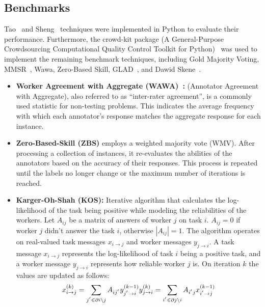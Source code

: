 \subsection{Benchmarks}
Tao~\cite{tao_Label_2020} and Sheng~\cite{sheng_Majority_2019} techniques were implemented in Python to evaluate their performance. Furthermore, the crowd-kit package (A General-Purpose Crowdsourcing Computational Quality Control Toolkit for Python)~\cite{ustalov_learning_2021 } was used to implement the remaining benchmark techniques, including Gold Majority Voting, MMSR~\cite{ma_Adversarial_2020}, Wawa, Zero-Based Skill, GLAD~\cite{whitehill_Whose_2009}, and Dawid Skene~\cite{dawid_Maximum_1979}.
%
\begin{itemize}
    \item \textbf{Worker Agreement with Aggregate (WAWA)~\cite{crowdkit_wawa_2023}:} (Annotator Agreement with Aggregate), also referred to as ``inter-rater agreement'', is a commonly used statistic for non-testing problems. This indicates the average frequency with which each annotator's response matches the aggregate response for each instance.
    \item \textbf{Zero-Based-Skill (ZBS)} employs a weighted majority vote (WMV). After processing a collection of instances, it re-evaluates the abilities of the annotators based on the accuracy of their responses. This process is repeated until the labels no longer change or the maximum number of iterations is reached.
    \item \textbf{Karger-Oh-Shah (KOS):} Iterative algorithm that calculates the log-likelihood of the task being positive while modeling the reliabilities of the workers. Let $A_{ij}$ be a matrix of answers of worker $j$ on task $i$. $A_{ij} = 0$ if worker $j$ didn't answer the task $i$, otherwise $|A_{ij}| = 1$. The algorithm operates on real-valued task messages $x_{i \rightarrow j}$  and worker messages $y_{j \rightarrow i}$. A task message $x_{i \rightarrow j}$ represents the log-likelihood of task $i$ being a positive task, and a worker message $y_{j \rightarrow i}$ represents how reliable worker $j$ is. On iteration $k$ the values are updated as follows:
    \begin{equation}
        x_{i \rightarrow j}^{(k)} = \sum_{j^{'} \in \partial i \backslash j} A_{ij^{'}} y_{j^{'} \rightarrow i}^{(k-1)} \\
        y_{j \rightarrow i}^{(k)} = \sum_{i^{'} \in \partial j \backslash i} A_{i^{'}j} x_{i^{'} \rightarrow j}^{(k-1)}
    \end{equation}

\end{itemize}
